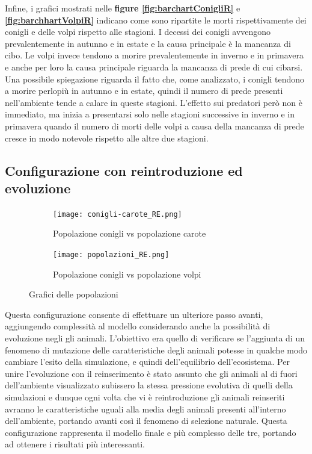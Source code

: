 \documentclass[11pt]{article}
\begin{document}
Infine, i grafici mostrati nelle \textbf{figure \ref{fig:barchartConigliR}} e \textbf{\ref{fig:barchhartVolpiR}} indicano come sono ripartite le morti rispettivamente dei conigli e delle volpi rispetto alle stagioni. I decessi dei conigli avvengono prevalentemente in autunno e in estate e la causa principale è la mancanza di cibo. Le volpi invece tendono a morire prevalentemente in inverno e in primavera e anche per loro la causa principale riguarda la mancanza di prede di cui cibarsi. Una possibile spiegazione riguarda il fatto che, come analizzato, i conigli tendono a morire perlopiù in autunno e in estate, quindi il numero di prede presenti nell'ambiente tende a calare in queste stagioni. L'effetto sui predatori però non è immediato, ma inizia a presentarsi solo nelle stagioni successive in inverno e in primavera quando il numero di morti delle volpi a causa della mancanza di prede cresce in modo notevole rispetto alle altre due stagioni.  


\newpage


\subsection{Configurazione con reintroduzione ed evoluzione}

\begin{figure}[h!]
	\begin{subfigure}{\textwidth}
    \centering
     \texttt{[image: conigli-carote\_RE.png]}
     \caption{Popolazione conigli vs popolazione carote}
     \label{fig:conigliCaroteRE}
	\end{subfigure}
	\begin{subfigure}{\textwidth}
		\centering
     \texttt{[image: popolazioni\_RE.png]}
     \caption{Popolazione conigli vs popolazione volpi}
     \label{fig:conigliVolpiRE}
	\end{subfigure}
	 \caption{Grafici delle popolazioni}
\end{figure}

\newpage
\noindent Questa configurazione consente di effettuare un ulteriore passo avanti, aggiungendo complessità al modello considerando anche la possibilità di evoluzione negli gli animali. L'obiettivo era quello di verificare se l'aggiunta di un fenomeno di mutazione delle caratteristiche degli animali potesse in qualche modo cambiare l'esito della simulazione, e quindi dell'equilibrio dell'ecosistema. Per unire l'evoluzione con il reinserimento è stato assunto che gli animali al di fuori dell'ambiente visualizzato subissero la stessa pressione evolutiva di quelli della simulazioni e dunque ogni volta che vi è reintroduzione gli animali reinseriti avranno le caratteristiche uguali alla media degli animali presenti all'interno dell'ambiente, portando avanti così il fenomeno di selezione naturale. Questa configurazione rappresenta il modello finale e più complesso delle tre, portando ad ottenere i risultati più interessanti.
\end{document}
